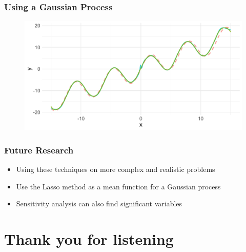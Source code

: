 \documentclass[aspectratio=169]{beamer}
\begin{document}
\begin{frame}
	\frametitle{Using a Gaussian Process}
	\begin{figure}
		\includegraphics[width=0.9\linewidth]{gp-trained.pdf}
	\end{figure}
\end{frame}

\begin{frame}
	\frametitle{Future Research}
	\begin{itemize}
		\item Using these techniques on more complex and realistic problems
		\item Use the Lasso method as a mean function for a Gaussian process
		\item Sensitivity analysis can also find significant variables
	\end{itemize}
\end{frame}
\section{Thank you for listening}
\end{document}
